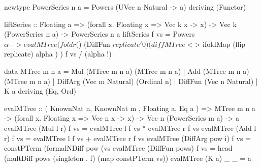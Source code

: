 \documentclass[%
  sigconf,authorversion,screen]{acmart}
\begin{document}
\begin{code}
newtype PowerSeries n a 
  = Powers (UVec n Natural -> a)
  deriving (Functor)

liftSeries :: Floating a =>
  (forall x. Floating x => Vec k x -> x)
  -> Vec k (PowerSeries n a)
  -> PowerSeries n a
liftSeries f vs = Powers $ \alpha ->
  evalMTree
  ( foldr
    ($)
    (DiffFun $ replicate' 0)
    (diffMTree <$> 
      ifoldMap (flip replicate) alpha
    )
  )
  f
  vs
  / (alpha !)

data MTree m n a
  = Mul (MTree m n a) (MTree m n a)
  | Add (MTree m n a) (MTree m n a)
  | DiffArg (Vec m Natural) (Ordinal n)
  | DiffFun (Vec n Natural)
  | K a
  deriving (Eq, Ord)

evalMTree ::
  ( KnownNat n, KnownNat m
  , Floating a, Eq a
  ) => MTree m n a
    -> (forall x. Floating x 
        => Vec n x -> x)
    -> Vec n (PowerSeries m a)
    -> a
evalMTree (Mul l r) f vs = 
    evalMTree l f vs 
  * evalMTree r f vs
evalMTree (Add l r) f vs =
    evalMTree l f vs 
  + evalMTree r f vs
evalMTree (DiffArg pow i) f vs =
  constPTerm 
    (formalNDiff pow (vs %
evalMTree (DiffFun pows) f vs =
  head 
    (multDiff pows (singleton . f)
      (map constPTerm vs))
evalMTree (K a) _ _ = a
\end{code}



\end{document}
